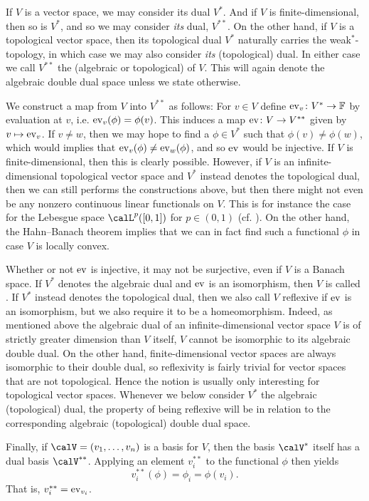 If $V$ is a vector space, we may consider its dual $V^*$. And if $V$ is finite-dimensional, then so is $V^*$, and so we may consider \emph{its} dual, $V^{**}$. On the other hand, if $V$ is a topological vector space, then its topological dual $V^*$ naturally carries the weak$^*$-topology, in which case we may also consider \emph{its} (topological) dual. In either case we call $V^{**}$ the (algebraic or topological)  of $V$. This will again denote the algebraic double dual space unless we state otherwise.

We construct a map from $V$ into $V^{**}$ as follows: For $v \in V$ define $\mathrm{ev}_v \colon V^* \to \mathbb{F}$ by evaluation at $v$, i.e. $\ev_v(\phi) = \phi(v)$. This induces a map $\mathrm{ev} \colon V \to V^{**}$ given by $v \mapsto \mathrm{ev}_v$. If $v \neq w$, then we may hope to find a $\phi \in V^*$ such that $\phi(v) \neq \phi(w)$, which would implies that $\ev_v(\phi) \neq \ev_w(\phi)$, and so $\mathrm{ev}$ would be injective. If $V$ is finite-dimensional, then this is clearly possible. However, if $V$ is an infinite-dimensional topological vector space and $V^*$ instead denotes the topological dual, then we can still performs the constructions above, but then there might not even be any nonzero continuous linear functionals on $V$. This is for instance the case for the Lebesgue space $\calL^p([0,1])$ for $p \in (0,1)$ (cf. \cite[§1.47]{rudinfunctional}). On the other hand, the Hahn--Banach theorem implies that we can in fact find such a functional $\phi$ in case $V$ is locally convex.

Whether or not $\mathrm{ev}$ is injective, it may not be surjective, even if $V$ is a Banach space. If $V^*$ denotes the algebraic dual and $\mathrm{ev}$ is an isomorphism, then $V$ is called . If $V^*$ instead denotes the topological dual, then we also call $V$ reflexive if $\mathrm{ev}$ is an isomorphism, but we also require it to be a homeomorphism. Indeed, as mentioned above the algebraic dual of an infinite-dimensional vector space $V$ is of strictly greater dimension than $V$ itself, $V$ cannot be isomorphic to its algebraic double dual. On the other hand, finite-dimensional vector spaces are always isomorphic to their double dual, so reflexivity is fairly trivial for vector spaces that are not topological. Hence the notion is usually only interesting for topological vector spaces. Whenever we below consider $V^*$ the algebraic (topological) dual, the property of being reflexive will be in relation to the corresponding algebraic (topological) double dual space.

Finally, if $\calV = (v_1, \ldots, v_n)$ is a basis for $V$, then the basis $\calV^*$ itself has a dual basis $\calV^{**}$. Applying an element $v_i^{**}$ to the functional $\phi$ then yields
%
\begin{equation*}
    v_i^{**}(\phi)
        = \phi_i
        = \phi(v_i).
\end{equation*}
%
That is, $v_i^{**} = \mathrm{ev}_{v_i}$.

